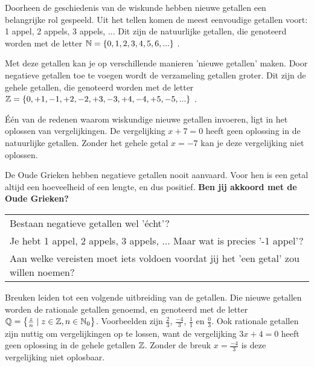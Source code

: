 \documentclass{ximera}
\begin{document}
    \author{Kwinten Obbels}

Doorheen de geschiedenis van de wiskunde hebben nieuwe getallen een belangrijke rol gespeeld.
Uit het tellen komen de meest eenvoudige getallen voort: 1 appel, 2 appels, 3 appels, ... 
Dit zijn de natuurlijke getallen, die genoteerd worden met de letter \( \mathbb{N} = \{0, 1, 2, 3, 4, 5, 6, ...\} \) . 



Met deze getallen kan je op verschillende manieren 'nieuwe getallen' maken. 
Door negatieve getallen toe te voegen wordt de verzameling getallen groter.  
Dit zijn de gehele getallen, die genoteerd worden met de letter  \( \mathbb{Z} = \{0, +1,-1,+2,-2,+3,-3,+4,-4,+5,-5, ... \} \) . 


Één van de redenen waarom wiskundige nieuwe getallen invoeren, ligt in het oplossen van vergelijkingen. 
De vergelijking \(x + 7 = 0\) heeft geen oplossing in de natuurlijke getallen.
Zonder het gehele getal \(x = -7\) kan je deze vergelijking niet oplossen. 



\begin{denkvraag*}{}
    De Oude Grieken hebben negatieve getallen nooit aanvaard. 
    Voor hen is een getal altijd een hoeveelheid of een lengte, en dus positief. 
    \textbf{Ben jij akkoord met de Oude Grieken?}
    \\
\begin{tabular}{@{\qquad}l}
    Bestaan negatieve getallen wel 'écht'? \\
    Je hebt 1 appel, 2 appels, 3 appels, ... Maar wat is precies '-1 appel'? \\
    Aan welke vereisten moet iets voldoen voordat jij het 'een getal' zou willen noemen? \\
\end{tabular}
\end{denkvraag*}

\vspace{4mm}


Breuken leiden tot een volgende uitbreiding van de getallen.
Die nieuwe getallen worden de rationale getallen genoemd, en genoteerd met de letter \( \mathbb{Q}  = \left\{ \frac{z}{n} \mid z \in \mathbb{Z}, n \in \mathbb{N}_0 \right\}\).
Voorbeelden zijn \(\frac{2}{3}\), \(\frac{-4}{3}\), \(\frac{1}{1}\) en \(\frac{0}{3}\). 
Ook rationale getallen zijn nuttig om vergelijkingen op te lossen, 
want de vergelijking \(3x + 4 = 0\) heeft geen oplossing in de gehele getallen \( \mathbb{Z} \).
Zonder de breuk \(x = \frac{-4}{3}\) is deze vergelijking niet oplosbaar.
\end{document}
